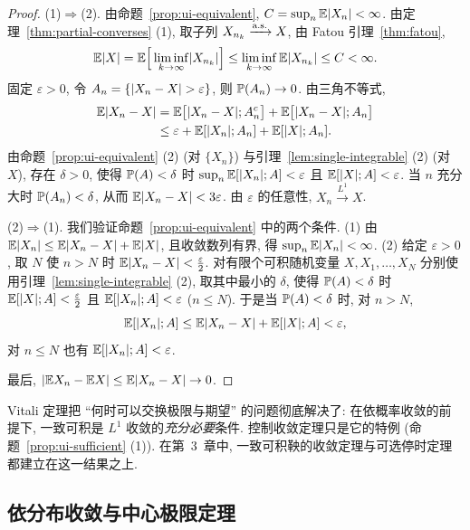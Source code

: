 \begin{proof}
(1)$\Rightarrow$(2). 由命题~\ref{prop:ui-equivalent}, $C=\sup_n\E\abs{X_n}<\infty$. 由定理~\ref{thm:partial-converses} (1), 取子列 $X_{n_k}\xrightarrow{\as}X$, 由 Fatou 引理~\ref{thm:fatou},
\[
\E\abs{X}=\E\Big[\liminf_{k\to\infty}\abs{X_{n_k}}\Big]\le\liminf_{k\to\infty}\E\abs{X_{n_k}}\le C<\infty.
\]
固定 $\varepsilon>0$, 令 $A_n=\{\abs{X_n-X}>\varepsilon\}$, 则 $\P(A_n)\to0$. 由三角不等式,
\begin{align*}
\E\abs{X_n-X}&=\E\big[\abs{X_n-X};A_n^c\big]+\E\big[\abs{X_n-X};A_n\big]\\
&\le\varepsilon+\E[\abs{X_n};A_n]+\E[\abs{X};A_n].
\end{align*}
由命题~\ref{prop:ui-equivalent} (2) (对 $\{X_n\}$) 与引理~\ref{lem:single-integrable} (2) (对 $X$), 存在 $\delta>0$, 使得 $\P(A)<\delta$ 时 $\sup_n\E[\abs{X_n};A]<\varepsilon$ 且 $\E[\abs{X};A]<\varepsilon$. 当 $n$ 充分大时 $\P(A_n)<\delta$, 从而 $\E\abs{X_n-X}<3\varepsilon$. 由 $\varepsilon$ 的任意性, $X_n\xrightarrow{L^1}X$.

(2)$\Rightarrow$(1). 我们验证命题~\ref{prop:ui-equivalent} 中的两个条件. (1) 由 $\E\abs{X_n}\le\E\abs{X_n-X}+\E\abs{X}$, 且收敛数列有界, 得 $\sup_n\E\abs{X_n}<\infty$. (2) 给定 $\varepsilon>0$, 取 $N$ 使 $n>N$ 时 $\E\abs{X_n-X}<\frac{\varepsilon}{2}$. 对有限个可积随机变量 $X,X_1,\dots,X_N$ 分别使用引理~\ref{lem:single-integrable} (2), 取其中最小的 $\delta$, 使得 $\P(A)<\delta$ 时 $\E[\abs{X};A]<\frac{\varepsilon}{2}$ 且 $\E[\abs{X_n};A]<\varepsilon$ ($n\le N$). 于是当 $\P(A)<\delta$ 时, 对 $n>N$,
\[
\E[\abs{X_n};A]\le\E\abs{X_n-X}+\E[\abs{X};A]<\varepsilon,
\]
对 $n\le N$ 也有 $\E[\abs{X_n};A]<\varepsilon$.

最后, $\abs{\E X_n-\E X}\le\E\abs{X_n-X}\to0$.
\end{proof}

\begin{intuition}
Vitali 定理把 ``何时可以交换极限与期望'' 的问题彻底解决了: 在依概率收敛的前提下, 一致可积是 $L^1$ 收敛的\emph{充分必要}条件. 控制收敛定理只是它的特例 (命题~\ref{prop:ui-sufficient} (1)). 在第~3~章中, 一致可积鞅的收敛定理与可选停时定理都建立在这一结果之上.
\end{intuition}

\subsection{依分布收敛与中心极限定理}


